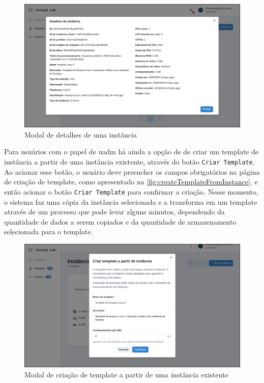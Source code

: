 \begin{figure}[H]
\caption{Modal de detalhes de uma instância}
\label{fig:instanceDetails}
\includegraphics[width=\textwidth]{capitulos/3-resultados/files/instance-details.png}
\end{figure}

Para usuários com o papel de \gls{uadm} há ainda a opção de de criar um template de instância a partir de uma instância existente, através do botão \texttt{Criar Template}. Ao acionar esse botão, o usuário deve preencher os campos obrigatórios na página de criação de template, como apresentado na \autoref{fig:createTemplateFromInstance}, e então acionar o botão \texttt{Criar Template} para confirmar a criação. Nesse momento, o sistema faz uma cópia da instância selecionada e a transforma em um template através de um processo que pode levar alguns minutos, dependendo da quantidade de dados a serem copiados e da quantidade de armazenamento selecionada para o template.

\begin{figure}[H]
\caption{Modal de criação de template a partir de uma instância existente}
\label{fig:createTemplateFromInstance}
\includegraphics[width=\textwidth]{capitulos/3-resultados/files/create-template-from-instance.png}
\end{figure}

